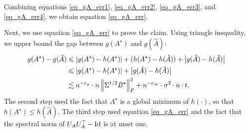 	Combining equations \eqref{eq_gA_err1}, \eqref{eq_gA_err2}, \eqref{eq_gA_err3}, and \eqref{eq_gA_err4}, we obtain equation \eqref{eq_gA_err}.

	\bigskip
	Next, we use equation \eqref{eq_gA_err} to prove the claim.
	Using triangle inequality, we upper bound the gap between $g(A^{\star})$ and $g(\hat{A})$:
	\begin{align}
		g(A^{\star}) - g(\hat{A}) &\leqslant {\left| {g(A^{\star}) - h(A^{\star})} \right|} + (h(A^{\star}) - h(\hat{A})) + \big|g(\hat{A}) - h(\hat{A})\big| \nonumber \\
		&\leqslant {\left| {g(A^{\star}) - h(A^{\star})} \right|}  + \big|g(\hat{A}) - h(\hat{A})\big|\nonumber \\
		&\lesssim n^{-c_\varphi}\cdot n \left\| \Sigma^{1/2} B^{\star} \right\|_{F}^2 + n^{-c_\infty}\cdot \sigma^2 \cdot n \cdot t. \label{eq_g_gap}
	\end{align}
	The second step used the fact that $A^{\star}$ is a global minimum of $h(\cdot)$, so that $h(A^{\star}) \le h(\hat{A})$.
	The third step used equation \eqref{eq_gA_err} and the fact that the spectral norm of $U_A U_A^{\top} - \operatorname{Id}$ is at most one.

